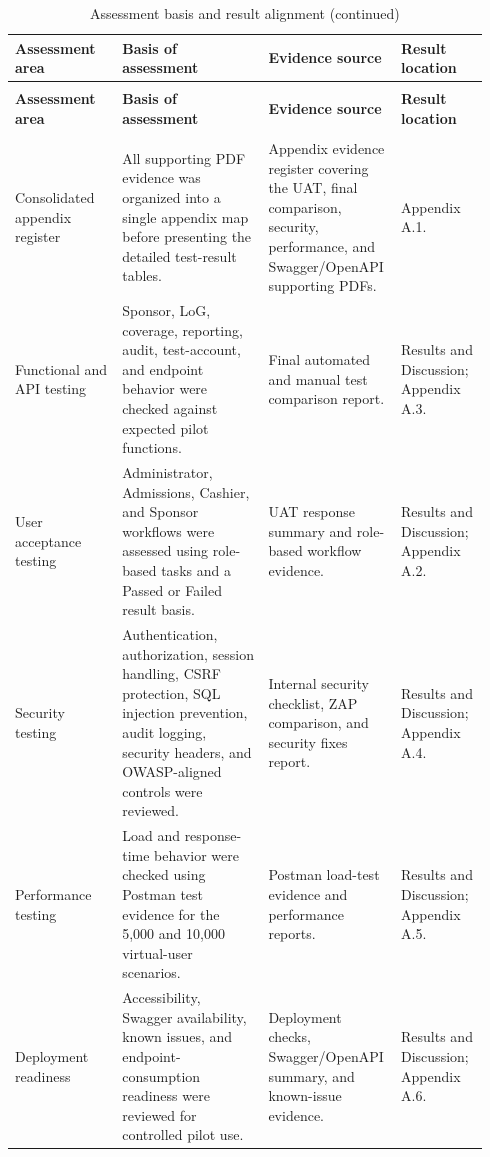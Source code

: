 \setlength{\LTleft}{0pt}
\setlength{\LTright}{\fill}
\begin{longtable}{>{\raggedright\arraybackslash}p{0.22\linewidth}
>{\raggedright\arraybackslash}p{0.30\linewidth}
>{\raggedright\arraybackslash}p{0.24\linewidth}
>{\raggedright\arraybackslash}p{0.18\linewidth}}
\caption{Assessment basis and result alignment}\label{table:assessment-basis}\\
\toprule
\textbf{Assessment area} & \textbf{Basis of assessment} & \textbf{Evidence source} & \textbf{Result location} \\
\midrule
\endfirsthead
\caption[]{Assessment basis and result alignment (continued)}\\
\toprule
\textbf{Assessment area} & \textbf{Basis of assessment} & \textbf{Evidence source} & \textbf{Result location} \\
\midrule
\endhead
\midrule
\multicolumn{4}{r}{\textit{Continued on next page}}\\
\endfoot
\bottomrule
\endlastfoot
Consolidated appendix register & All supporting PDF evidence was organized into a single appendix map before presenting the detailed test-result tables. & Appendix evidence register covering the UAT, final comparison, security, performance, and Swagger/OpenAPI supporting PDFs. & Appendix A.1. \\
Functional and API testing & Sponsor, LoG, coverage, reporting, audit, test-account, and endpoint behavior were checked against expected pilot functions. & Final automated and manual test comparison report. & Results and Discussion; Appendix A.3. \\
User acceptance testing & Administrator, Admissions, Cashier, and Sponsor workflows were assessed using role-based tasks and a Passed or Failed result basis. & UAT response summary and role-based workflow evidence. & Results and Discussion; Appendix A.2. \\
Security testing & Authentication, authorization, session handling, CSRF protection, SQL injection prevention, audit logging, security headers, and OWASP-aligned controls were reviewed. & Internal security checklist, ZAP comparison, and security fixes report. & Results and Discussion; Appendix A.4. \\
Performance testing & Load and response-time behavior were checked using Postman test evidence for the 5,000 and 10,000 virtual-user scenarios. & Postman load-test evidence and performance reports. & Results and Discussion; Appendix A.5. \\
Deployment readiness & Accessibility, Swagger availability, known issues, and endpoint-consumption readiness were reviewed for controlled pilot use. & Deployment checks, Swagger/OpenAPI summary, and known-issue evidence. & Results and Discussion; Appendix A.6. \\
\end{longtable}

